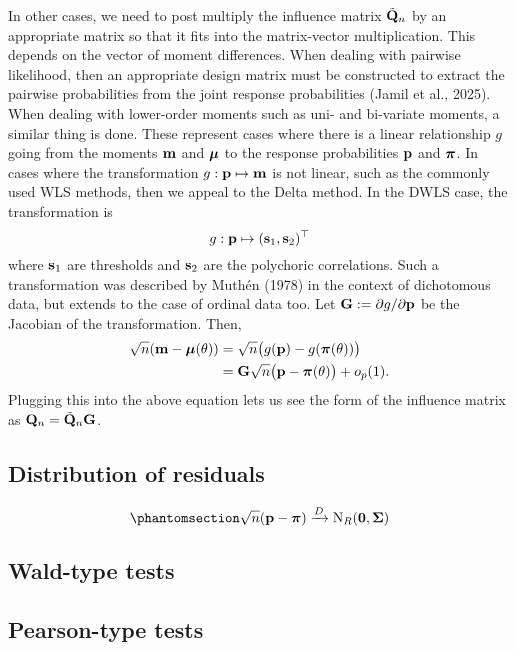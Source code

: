 \documentclass[
  letterpaper,
  DIV=11,
  numbers=noendperiod]{scrartcl}
\begin{document}
In other cases, we need to post multiply the influence matrix
\(\tilde{{\mathbf Q}}_n\) by an appropriate matrix so that it fits into the
matrix-vector multiplication. This depends on the vector of moment
differences. When dealing with pairwise likelihood, then an appropriate
design matrix must be constructed to extract the pairwise probabilities
from the joint response probabilities (Jamil et al., 2025). When dealing
with lower-order moments such as uni- and bi-variate moments, a similar
thing is done. These represent cases where there is a linear
relationship \(g\) going from the moments \({\mathbf m}\) and \({\boldsymbol\mu}\) to the
response probabilities \({\mathbf p}\) and \({\boldsymbol\pi}\). In cases where the
transformation \(g: {\mathbf p} \mapsto {\mathbf m}\) is not linear, such as the
commonly used WLS methods, then we appeal to the Delta method. In the
DWLS case, the transformation is \[
g: {\mathbf p} \mapsto ({\mathbf s}_1, {\mathbf s}_2)^\top
\] where \({\mathbf s}_1\) are thresholds and \({\mathbf s}_2\) are the polychoric
correlations. Such a transformation was described by Muthén (1978) in
the context of dichotomous data, but extends to the case of ordinal data
too. Let \({\mathbf G} := \partial g / \partial {\mathbf p}\) be the Jacobian of the
transformation. Then, \[
\begin{aligned}
\sqrt n ({\mathbf m} - {\boldsymbol\mu}(\theta)) 
&= \sqrt n \big(g({\mathbf p}) - g({\boldsymbol\pi}(\theta))\big) \\
&= {\mathbf G} \sqrt n \big({\mathbf p} - {\boldsymbol\pi}(\theta)\big) + o_p(1).
\end{aligned}
\] Plugging this into the above equation lets us see the form of the
influence matrix as \({\mathbf Q}_n = \tilde{{\mathbf Q}}_n {\mathbf G}\).

\subsection{Distribution of residuals}\label{distribution-of-residuals}

\begin{equation}\phantomsection\label{eq-clt-prop}{
\sqrt{n} (\bp - \bpi) \xrightarrow{D} {\N}_R(\bzero, \bSigma)
}\end{equation}

\subsection{Wald-type tests}\label{wald-type-tests}

\subsection{Pearson-type tests}\label{pearson-type-tests}
\end{document}
